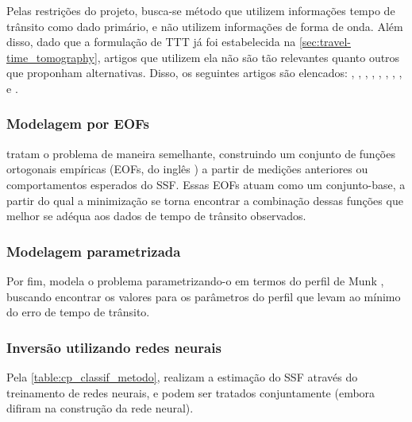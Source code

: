 Pelas restrições do projeto, busca-se método que utilizem informações tempo de trânsito como dado primário, e não utilizem informações de forma de onda. Além disso, dado que a formulação de TTT já foi estabelecida na \cref{sec:travel-time_tomography}, artigos que utilizem ela não são tão relevantes quanto outros que proponham alternativas. Disso, os seguintes artigos são elencados: \citet{agata_bayesian_2023}, \citet{jo_seismic_2024}, \citet{jo_seismic_2024}, \citet{li_multiscale_2024}, \citet{mei_uncertainty_2025}, \citet{yu_krylov_2021}, \citet{zhang_nonlinear_2022}, \citet{radhakrishnan_inversion_2024}, e \citet{wu_inversion_2023}.

\subsubsection*{Modelagem por EOFs}
\citet{yu_krylov_2021,radhakrishnan_inversion_2024} tratam o problema de maneira semelhante, construindo um conjunto de funções ortogonais empíricas (EOFs, do inglês ) a partir de medições anteriores ou comportamentos esperados do SSF. Essas EOFs atuam como um conjunto-base, a partir do qual a minimização se torna encontrar a combinação dessas funções que melhor se adéqua aos dados de tempo de trânsito observados.

\subsubsection*{Modelagem parametrizada}
Por fim, \citet{wu_inversion_2023} modela o problema parametrizando-o em termos do perfil de Munk \cite{munk_sound_1974}, buscando encontrar os valores para os parâmetros do perfil que levam ao mínimo do erro de tempo de trânsito.

\subsubsection*{Inversão utilizando redes neurais}
Pela \cref{table:cp_classif_metodo}, \cite{agata_bayesian_2023,jo_seismic_2023,jo_seismic_2024,mei_uncertainty_2025,zhang_nonlinear_2022} realizam a estimação do SSF através do treinamento de redes neurais, e podem ser tratados conjuntamente (embora difiram na construção da rede neural).


